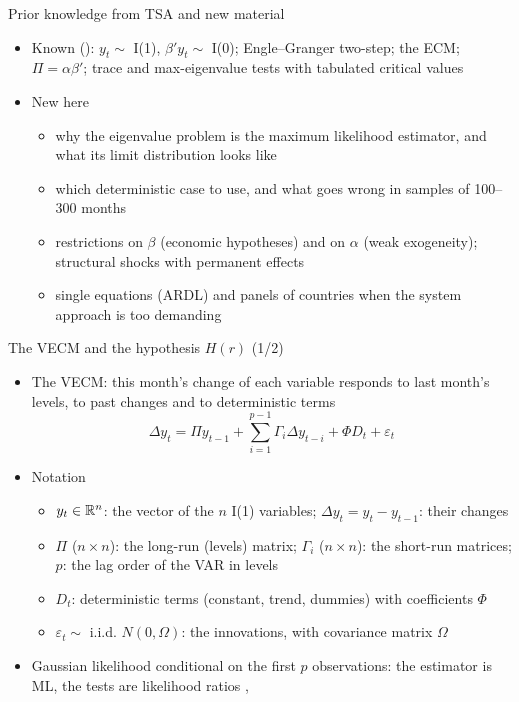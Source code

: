 \begin{frame}{Prior knowledge from TSA and new material}
\itemsize{\small}
\begin{itemize}
    \item Known (): $y_t \sim$ I(1), $\beta'y_t \sim$ I(0); Engle--Granger two-step; the ECM; $\Pi = \alpha\beta'$; trace and max-eigenvalue tests with tabulated critical values
    \item New here
    \begin{itemize}
        \item why the eigenvalue problem is the maximum likelihood estimator, and what its limit distribution looks like
        \item which deterministic case to use, and what goes wrong in samples of 100--300 months
        \item restrictions on $\beta$ (economic hypotheses) and on $\alpha$ (weak exogeneity); structural shocks with permanent effects
        \item single equations (ARDL) and panels of countries when the system approach is too demanding
    \end{itemize}
\end{itemize}
\end{frame}

\begin{frame}{The VECM and the hypothesis $H(r)$ (1/2)}
\itemsize{\small}
\begin{itemize}
    \item The VECM: this month's change of each variable responds to last month's levels, to past changes and to deterministic terms \[ \Delta y_t = \Pi y_{t-1} + \sum_{i=1}^{p-1}\Gamma_i\Delta y_{t-i} + \Phi D_t + \varepsilon_t \]
    \item Notation
    \begin{itemize}
        \item $y_t \in \mathbb{R}^n$: the vector of the $n$ I(1) variables; $\Delta y_t = y_t - y_{t-1}$: their changes
        \item $\Pi$ ($n\times n$): the long-run (levels) matrix; $\Gamma_i$ ($n\times n$): the short-run matrices; $p$: the lag order of the VAR in levels
        \item $D_t$: deterministic terms (constant, trend, dummies) with coefficients $\Phi$
        \item $\varepsilon_t \sim$ i.i.d. $N(0, \Omega)$: the innovations, with covariance matrix $\Omega$
    \end{itemize}
    \item Gaussian likelihood conditional on the first $p$ observations: the estimator is ML, the tests are likelihood ratios , 
\end{itemize}
\end{frame}

